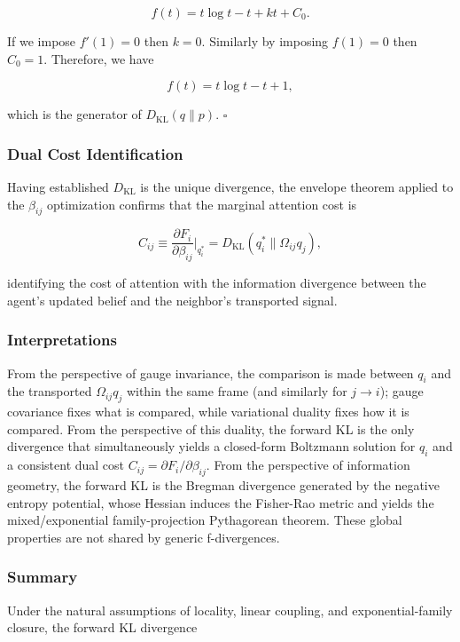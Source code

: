 \documentclass[twoside,11pt]{article}
\begin{document}
\[
f(t) = t\log t - t + kt + C_0.
\]

If we impose $f'(1)=0$ then $k=0$. Similarly by imposing $f(1)=0$ then $C_0 = 1$. Therefore, we have

\[
f(t) = t\log t - t + 1,
\]

which is the generator of $D_{\mathrm{KL}}(q \| p)$. \hfill $\square$

\subsubsection{Dual Cost Identification}
Having established $D_{\mathrm{KL}}$ is the unique divergence, the envelope theorem applied to the $\beta_{ij}$ optimization confirms that the marginal attention cost is

\begin{equation}
C_{ij} \equiv \frac{\partial F_i}{\partial\beta_{ij}}\bigg|_{q_i^*}
= D_{\mathrm{KL}}(q_i^* \| \Omega_{ij}q_j),
\end{equation}

identifying the cost of attention with the information divergence between the agent's updated belief and the neighbor's transported signal.

\subsubsection{Interpretations}
From the perspective of gauge invariance, the comparison is made between $q_i$ and the transported $\Omega_{ij}q_j$ within the same frame (and similarly for $j \rightarrow i$); gauge covariance fixes what is compared, while variational duality fixes how it is compared. From the perspective of this duality, the forward KL is the only divergence that simultaneously yields a closed-form Boltzmann solution for $q_i$ and a consistent dual cost $C_{ij} = \partial F_i / \partial \beta_{ij}$. From the perspective of information geometry, the forward KL is the Bregman divergence generated by the negative entropy potential, whose Hessian induces the Fisher-Rao metric and yields the mixed/exponential family-projection Pythagorean theorem. These global properties are not shared by generic f-divergences.

\subsubsection{Summary}
Under the natural assumptions of locality, linear coupling, and exponential-family closure, the forward KL divergence
\end{document}
